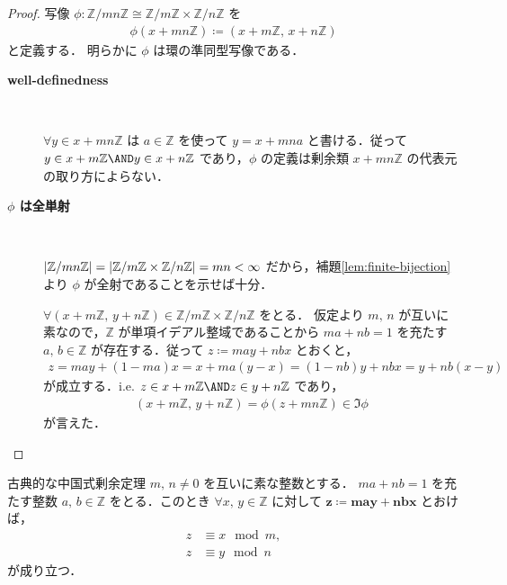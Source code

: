 \documentclass[geometry_main]{subfiles}
\begin{document}
\begin{proof}
	写像 $\phi \colon \mathbb{Z}/mn\mathbb{Z} \cong \mathbb{Z}/m \mathbb{Z} \times \mathbb{Z}/n\mathbb{Z}$ を
	\begin{align}
		\phi(x + mn\mathbb{Z}) \coloneqq (x+m\mathbb{Z},\, x+n\mathbb{Z})
	\end{align}
	と定義する．
	明らかに $\phi$ は環の準同型写像である．
	\begin{description}
		\item[\textbf{well-definedness}]　
		
		$\forall y \in x + mn\mathbb{Z}$ は $a \in \mathbb{Z}$ を使って $y = x + mn a$ と書ける．従って $y \in x+m\mathbb{Z} \AND y \in x+n\mathbb{Z}$ であり，$\phi$ の定義は剰余類 $x + mn\mathbb{Z}$ の代表元の取り方によらない．
		\item[\textbf{$\phi$ は全単射}]　
		
		$\abs{\mathbb{Z}/mn\mathbb{Z}} = \abs{\mathbb{Z}/m \mathbb{Z} \times \mathbb{Z}/n\mathbb{Z}} = mn < \infty$ だから，補題\ref{lem:finite-bijection}より $\phi$ が全射であることを示せば十分．
		
		$\forall (x+m\mathbb{Z},\, y+n\mathbb{Z}) \in \mathbb{Z}/m \mathbb{Z} \times \mathbb{Z}/n\mathbb{Z}$ をとる．
		仮定より $m,\, n$ が互いに素なので，$\mathbb{Z}$ が単項イデアル整域であることから $ma + nb = 1$ を充たす $a,\, b \in \mathbb{Z}$ が存在する．従って $z \coloneqq may+nbx$ とおくと，
		\begin{align}
			z = may + (1-ma)x = x + ma(y-x) = (1-nb)y + nbx = y+nb(x-y)
		\end{align}
		が成立する．i.e. $z \in x+ m\mathbb{Z} \AND z \in y+n \mathbb{Z}$ であり，
		\begin{align}
			(x+m\mathbb{Z},\, y+n\mathbb{Z}) = \phi(z+mn\mathbb{Z}) \in \Im \phi
		\end{align}
		が言えた．
	\end{description}
\end{proof}

\begin{mycol}[label=col:ChineseRemainder]{古典的な中国式剰余定理}
	$m,\, n \neq 0$ を互いに素な整数とする．
	$ma+nb=1$ を充たす整数 $a,\, b \in \mathbb{Z}$ をとる．このとき $\forall x,\, y \in \mathbb{Z}$ に対して $\bm{z \coloneqq may+nbx}$ とおけば，
	\begin{align}
		z &\equiv x \mod{m}, \\
		z &\equiv y \mod{n}
	\end{align}
	が成り立つ．
\end{mycol}
\end{document}
